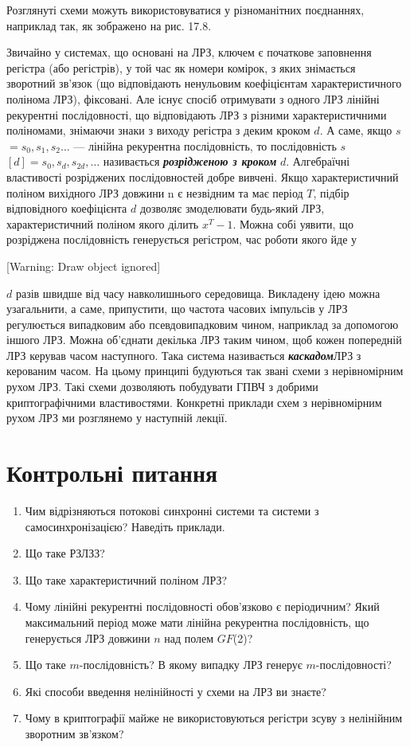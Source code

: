 {{{{Розглянуті схеми можуть використовуватися у різноманітних поєднаннях, наприклад
так, як зображено на рис. 17.8. 

Звичайно у системах, що основані на ЛРЗ, ключем є початкове заповнення регістра
(або регістрів), у той час як номери комірок, з яких знімається зворотний
зв’язок (що відповідають ненульовим коефіцієнтам характеристичного полінома
ЛРЗ), фіксовані. Але існує спосіб отримувати з одного ЛРЗ лінійні рекурентні
послідовності, що відповідають ЛРЗ з різними характеристичними поліномами,
знімаючи знаки з виходу регістра з деким кроком  $d$. А саме, якщо
\textbf{$s$} $=s_0,s_1,s_2\dots$ ---
лінійна рекурентна послідовність, то послідовність \textbf{$s$}
$[d]=s_0,s_d,s_{2d},\dots$ називається
\textbf{\textit{розрідженою з кроком}}\textbf{ } $d$. Алгебраїчні властивості
розріджених послідовностей добре вивчені. Якщо характеристичний поліном
вихідного ЛРЗ довжини n є незвідним та має період  $T$, підбір відповідного
коефіцієнта  $d$ дозволяє змоделювати будь-який ЛРЗ, характеристичний поліном
якого ділить  $x^{T}-1$. Можна собі уявити, що розріджена послідовність
генерується регістром, час роботи якого йде у

[Warning: Draw object ignored] 

 $d$ разів швидше від часу навколишнього середовища. Викладену ідею можна
узагальнити, а саме, припустити, що частота часових імпульсів у ЛРЗ регулюється
випадковим або псевдовипадковим чином, наприклад за допомогою іншого ЛРЗ. Можна
об’єднати декілька ЛРЗ таким чином, щоб кожен попередній ЛРЗ керував часом
наступного. Така система називається \textbf{\textit{каскадом}}ЛРЗ з
керованим часом. На цьому принципі будуються так звані схеми з нерівномірним
рухом ЛРЗ. Такі схеми дозволяють побудувати ГПВЧ з добрими криптографічними
властивостями. Конкретні приклади схем з нерівномірним рухом ЛРЗ ми розглянемо
у наступній лекції.


\bigskip

\section{Контрольні питання}


\bigskip

\liststyleWWviiiNumlvi
\begin{enumerate}
\item Чим відрізняються потокові синхронні системи та системи з
самосинхронізацією? Наведіть приклади.
\item Що таке РЗЛЗЗ?
\item Що таке характеристичний поліном ЛРЗ?
\item Чому лінійні рекурентні послідовності обов’язково є періодичним? Який
максимальний період може мати лінійна рекурентна послідовність, що генерується
ЛРЗ довжини  $n$ над полем $GF$(2)? 
\item Що таке  $m$-послідовність? В якому випадку ЛРЗ генерує 
$m$-послідовності?
\item Які способи введення нелінійності у схеми на ЛРЗ ви знаєте?
\item Чому в криптографії майже не використовуються регістри зсуву з нелінійним
зворотним зв’язком?
\end{enumerate}

}}}}
